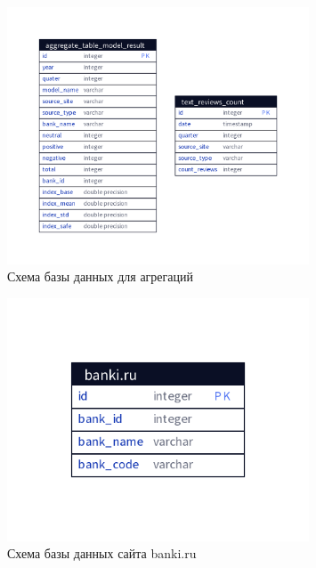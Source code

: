\documentclass[PI, VKR]{HSEUniversity}
\begin{document}
\begin{figure}[h!]
\centering
\includegraphics[width=0.8\textwidth]{img/d2/views_database.png}
\caption{\label{fig:database_views}Схема базы данных для агрегаций}
\end{figure}

\begin{figure}[h!]
\centering
\includegraphics[width=0.8\textwidth]{img/d2/banki_ru.png}
\caption{\label{fig:database_banki_ru}Схема базы данных сайта banki.ru}
\end{figure}
\end{document}
